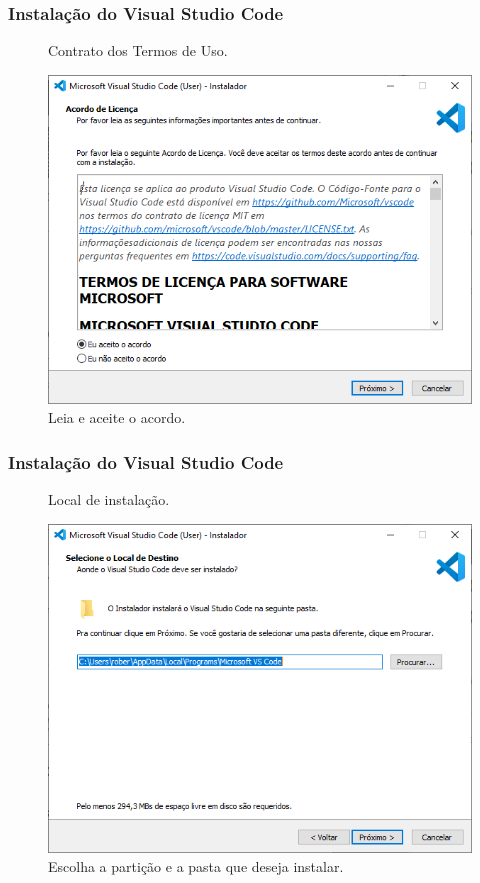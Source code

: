\documentclass{beamer}
\begin{document}
\begin{frame}
    \frametitle{Instalação do Visual Studio Code}
\begin{figure}[h]
    \centering
    \caption{Contrato dos Termos de Uso.}
    \label{fig:contrato}
    \includegraphics[width=0.8\textheight]{../images/contrato.png}
    \caption*{\footnotesize Leia e aceite o acordo.}
\end{figure}
\end{frame}

\begin{frame}
    \frametitle{Instalação do Visual Studio Code}
\begin{figure}[h]
    \centering
    \caption{Local de instalação.}
    \label{fig:local}
    \includegraphics[width=0.8\textheight]{../images/local.png}
    \caption*{\footnotesize Escolha a partição e a pasta que deseja instalar.}
\end{figure}
\end{frame}
\end{document}
